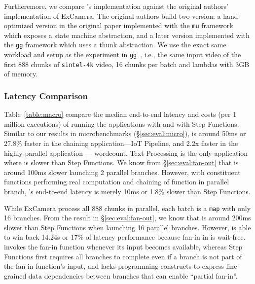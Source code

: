 \begin{itemize}
    Furtheremore, we compare \name{}'s implementation against the original
    authors' implementation of ExCamera. The original authors build two
    version: a hand-optimized version in the original paper implemented with
    the \texttt{mu} framework which exposes a state machine abstraction, and a
    later version implemented with the \texttt{gg} framework which uses a
    thunk abstraction. We use the exact same workload and setup as the
    experiment in \texttt{gg}~\cite{gg-atc}, i.e., the same input video of the
    first 888 chunks of \texttt{sintel-4k} video, 16 chunks per batch and
    lambdas with 3GB of memory.

\end{itemize}

\subsubsection{Latency Comparison}

Table~\ref{table:macro} compare the median end-to-end latency and costs (per 1
million executions) of running the applications with \name{} and with Step
Functions. Similar to our results in microbenchmarks (\S\ref{sec:eval:micro}),
\name{} is around 50ms or 27.8\% faster in the chaining application---IoT
Pipeline, and 2.2x faster in the highly-parallel application --- wordcount.
Text Processing is the only application where \name{} is slower than Step
Functions. We know from \S\ref{sec:eval:fan-out} that \name{} is around 100ms
slower launching 2 parallel branches. However, with constituent functions
performing real computation and chaining of function in parallel branch,
\name{}'s end-to-end latency is merely 10ms or 1.8\% slower than Step
Functions.

While ExCamera process all 888 chunks in parallel, each batch is a
\texttt{map} with only 16 branches. From the result in
\S\ref{sec:eval:fan-out}, we know that \name{} is around 200ms slower than
Step Functions when launching 16 parallel branches. However, \name{} is able
to win back 14.24s or 17\% of latency performance because fan-in in \name{} is
wait-free. \name{} invokes the fan-in function whenever its input becomes
available, whereas Step Functions first requires all branches to complete even
if a branch is not part of the fan-in function's input, and lacks programming
constructs to express fine-grained data dependencies between branches that can
enable ``partial fan-in''.


